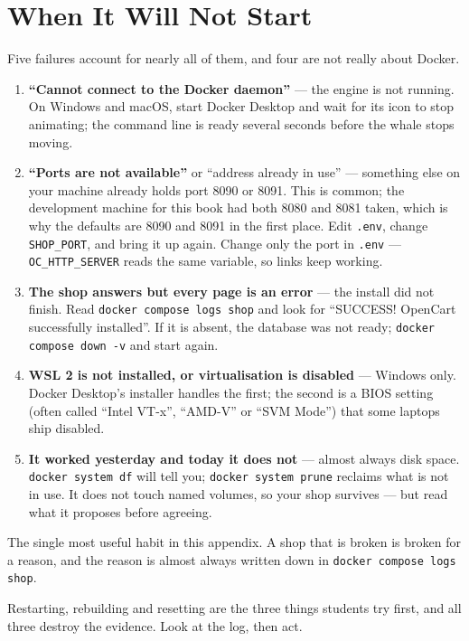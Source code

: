 \section{When It Will Not Start}

Five failures account for nearly all of them, and four are not really about
Docker.

\begin{enumerate}[leftmargin=2.2em, itemsep=5pt, topsep=4pt]
  \item \textbf{``Cannot connect to the Docker daemon''} --- the engine is not
        running. On Windows and macOS, start Docker Desktop and wait for its
        icon to stop animating; the command line is ready several seconds
        before the whale stops moving.
  \item \textbf{``Ports are not available''} or ``address already in use'' ---
        something else on your machine already holds port 8090 or 8091. This is
        common; the development machine for this book had both 8080 and 8081
        taken, which is why the defaults are 8090 and 8091 in the first place.
        Edit \texttt{.env}, change \texttt{SHOP\_PORT}, and bring it up again.
        Change only the port in \texttt{.env} --- \texttt{OC\_HTTP\_SERVER}
        reads the same variable, so links keep working.
  \item \textbf{The shop answers but every page is an error} --- the install
        did not finish. Read \texttt{docker compose logs shop} and look for
        ``SUCCESS! OpenCart successfully installed''. If it is absent, the
        database was not ready; \texttt{docker compose down -v} and start
        again.
  \item \textbf{WSL 2 is not installed, or virtualisation is disabled} ---
        Windows only. Docker Desktop's installer handles the first; the second
        is a BIOS setting (often called ``Intel VT-x'', ``AMD-V'' or
        ``SVM Mode'') that some laptops ship disabled.
  \item \textbf{It worked yesterday and today it does not} --- almost always
        disk space. \texttt{docker system df} will tell you;
        \texttt{docker system prune} reclaims what is not in use. It does not
        touch named volumes, so your shop survives --- but read what it
        proposes before agreeing.
\end{enumerate}

\begin{conceptbox}
The single most useful habit in this appendix. A shop that is broken is
broken for a reason, and the reason is almost always written down in
\texttt{docker compose logs shop}.

\smallskip
Restarting, rebuilding and resetting are the three things students try first,
and all three destroy the evidence. Look at the log, then act.
\end{conceptbox}

